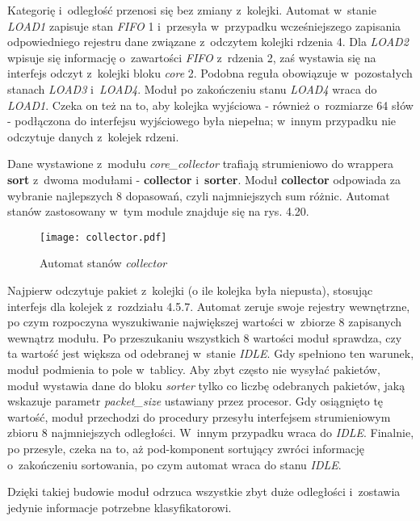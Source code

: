 Kategorię i~odległość przenosi się bez zmiany z~kolejki. Automat w~stanie \textit{LOAD1} zapisuje stan \textit{FIFO} 1 i~przesyła w~przypadku wcześniejszego zapisania odpowiedniego rejestru dane związane z~odczytem kolejki rdzenia 4. Dla \textit{LOAD2} wpisuje się informację o~zawartości \textit{FIFO} z~rdzenia 2, zaś wystawia się na interfejs odczyt z~kolejki bloku \textit{core} 2. Podobna reguła obowiązuje w~pozostałych stanach \textit{LOAD3} i~\textit{LOAD4}. Moduł po zakończeniu stanu \textit{LOAD4} wraca do \textit{LOAD1}. Czeka on też na to, aby kolejka wyjściowa - również o~rozmiarze 64 słów - podłączona do interfejsu wyjściowego była niepełna; w~innym przypadku nie odczytuje danych z~kolejek rdzeni.

Dane wystawione z~modułu \textit{core\_collector} trafiają strumieniowo do wrappera \textbf{sort} z~dwoma modułami - \textbf{collector} i~\textbf{sorter}. Moduł \textbf{collector} odpowiada za wybranie najlepszych 8 dopasowań, czyli najmniejszych sum różnic. Automat stanów zastosowany w~tym module znajduje się na rys. 4.20.

\begin{figure}[h]
	\centering
	\texttt{[image: collector.pdf]}
	\caption{Automat stanów \textit{collector}}
\end{figure}
\FloatBarrier %

Najpierw odczytuje pakiet z~kolejki (o ile kolejka była niepusta), stosując interfejs dla kolejek z~rozdziału 4.5.7. Automat zeruje swoje rejestry wewnętrzne, po czym rozpoczyna wyszukiwanie największej wartości w~zbiorze 8 zapisanych wewnątrz modułu. Po przeszukaniu wszystkich 8 wartości moduł sprawdza, czy ta wartość jest większa od odebranej w~stanie \textit{IDLE}. Gdy spełniono ten warunek, moduł podmienia to pole w~tablicy. Aby zbyt często nie wysyłać pakietów, moduł wystawia dane do bloku \textit{sorter} tylko co liczbę odebranych pakietów, jaką wskazuje parametr \textit{packet\_size} ustawiany przez procesor. Gdy osiągnięto tę wartość, moduł przechodzi do procedury przesyłu interfejsem strumieniowym zbioru 8 najmniejszych odległości. W~innym przypadku wraca do \textit{IDLE}. Finalnie, po przesyle, czeka na to, aż pod-komponent sortujący zwróci informację o~zakończeniu sortowania, po czym automat wraca do stanu \textit{IDLE}.

Dzięki takiej budowie moduł odrzuca wszystkie zbyt duże odległości i~zostawia jedynie informacje potrzebne klasyfikatorowi.

